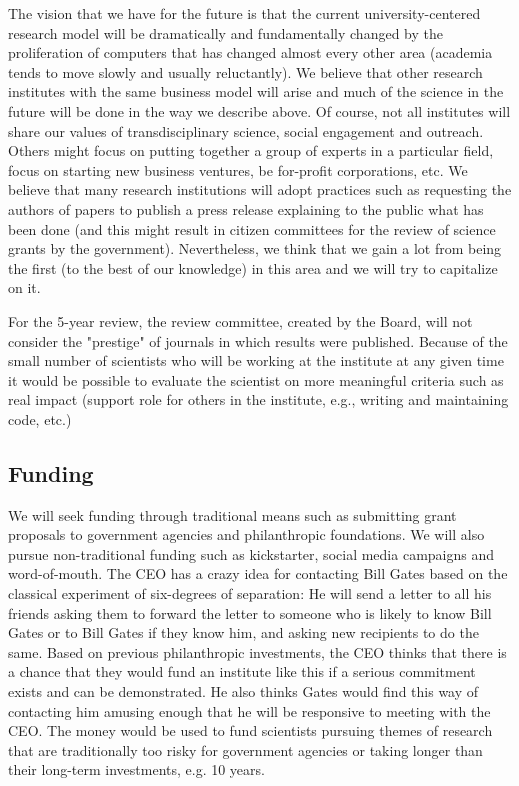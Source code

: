The vision that we have for the future is that the current university-centered research model will be dramatically and fundamentally changed by the proliferation of computers that has changed almost every other area (academia tends to move slowly and usually reluctantly). We believe that other research institutes with the same business model will arise and much of the science in the future will be done in the way we describe above. Of course, not all institutes will share our values of transdisciplinary science, social engagement and outreach. Others might focus on putting together a group of experts in a particular field, focus on starting new business ventures, be for-profit corporations, etc. We believe that many research institutions will adopt practices such as requesting the authors of papers to publish a press release explaining to the public what has been done (and this might result in citizen committees for the review of science grants by the government). Nevertheless, we think that we gain a lot from being the first (to the best of our knowledge) in this area and we will try to capitalize on it.

For the 5-year review, the review committee, created by the Board, will not consider the "prestige" of journals in which results were published. Because of the small number of scientists who will be working at the institute at any given time it would be possible to evaluate the scientist on more meaningful criteria such as real impact (support role for others in the institute, e.g., writing and maintaining code, etc.)

\subsection{Funding}

We will seek funding through traditional means such as submitting grant proposals to government agencies and philanthropic foundations. We will also pursue non-traditional funding such as kickstarter, social media campaigns and word-of-mouth. The CEO has a crazy idea for contacting Bill Gates based on the classical experiment of six-degrees of separation: He will send a letter to all his friends asking them to forward the letter to someone who is likely to know Bill Gates or to Bill Gates if they know him, and asking new recipients to do the same. Based on previous philanthropic investments, the CEO thinks that there is a chance that they would fund an institute like this if a serious commitment exists and can be demonstrated. He also thinks Gates would find this way of contacting him amusing enough that he will be responsive to meeting with the CEO. The money would be used to fund scientists pursuing themes of research that are traditionally too risky for government agencies or taking longer than their long-term investments, e.g. 10 years.
